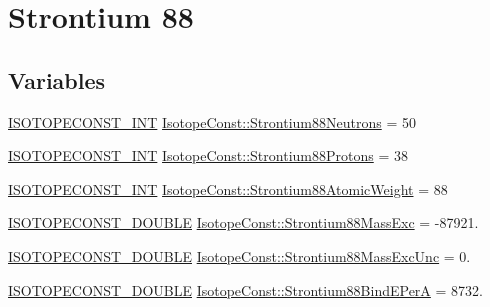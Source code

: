 \hypertarget{group___isotope_const-_strontium-_sr88}{}\section{Strontium 88}
\label{group___isotope_const-_strontium-_sr88}
\subsection*{Variables}
\begin{DoxyCompactItemize}
\item 
\mbox{\hyperlink{group___isotope_const-_macros_ga5f18360b3e99483a35c32d789e62621c}{I\+S\+O\+T\+O\+P\+E\+C\+O\+N\+S\+T\+\_\+\+I\+NT}} \mbox{\hyperlink{group___isotope_const-_strontium-_sr88_ga59f1d63908beb2ba52bab8cfbff22992}{Isotope\+Const\+::\+Strontium88\+Neutrons}} = 50
\item 
\mbox{\hyperlink{group___isotope_const-_macros_ga5f18360b3e99483a35c32d789e62621c}{I\+S\+O\+T\+O\+P\+E\+C\+O\+N\+S\+T\+\_\+\+I\+NT}} \mbox{\hyperlink{group___isotope_const-_strontium-_sr88_ga95cf00ea39fddaff85d31b0abead8e1d}{Isotope\+Const\+::\+Strontium88\+Protons}} = 38
\item 
\mbox{\hyperlink{group___isotope_const-_macros_ga5f18360b3e99483a35c32d789e62621c}{I\+S\+O\+T\+O\+P\+E\+C\+O\+N\+S\+T\+\_\+\+I\+NT}} \mbox{\hyperlink{group___isotope_const-_strontium-_sr88_ga4dba916e82f83ee2fa436026942a37a1}{Isotope\+Const\+::\+Strontium88\+Atomic\+Weight}} = 88
\item 
\mbox{\hyperlink{group___isotope_const-_macros_ga8f45a7272ce02c0b4c65c44636ed719a}{I\+S\+O\+T\+O\+P\+E\+C\+O\+N\+S\+T\+\_\+\+D\+O\+U\+B\+LE}} \mbox{\hyperlink{group___isotope_const-_strontium-_sr88_ga10bc6fc34c9e3c782189229f01b3daf4}{Isotope\+Const\+::\+Strontium88\+Mass\+Exc}} = -\/87921.
\item 
\mbox{\hyperlink{group___isotope_const-_macros_ga8f45a7272ce02c0b4c65c44636ed719a}{I\+S\+O\+T\+O\+P\+E\+C\+O\+N\+S\+T\+\_\+\+D\+O\+U\+B\+LE}} \mbox{\hyperlink{group___isotope_const-_strontium-_sr88_ga966fd97b0a0145a030771d83f99ea56d}{Isotope\+Const\+::\+Strontium88\+Mass\+Exc\+Unc}} = 0.
\item 
\mbox{\hyperlink{group___isotope_const-_macros_ga8f45a7272ce02c0b4c65c44636ed719a}{I\+S\+O\+T\+O\+P\+E\+C\+O\+N\+S\+T\+\_\+\+D\+O\+U\+B\+LE}} \mbox{\hyperlink{group___isotope_const-_strontium-_sr88_ga97b09bbbe3676360a05c589b28bac981}{Isotope\+Const\+::\+Strontium88\+Bind\+E\+PerA}} = 8732.
\item 

\end{DoxyCompactItemize}
